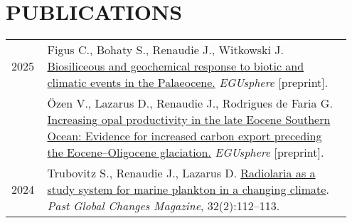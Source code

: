 \documentclass[11pt, a4paper]{article}
\begin{document}
\section{PUBLICATIONS}
\begin{longtable}{@{}p{0.1\linewidth} >{\small}P{0.85\linewidth}@{}}
2025 %
    & Figus C., Bohaty S., Renaudie J., Witkowski J. \href{https://egusphere.copernicus.org/preprints/2025/egusphere-2025-853/}{Biosiliceous and geochemical response to biotic and climatic events in the Palaeocene.} \textit{EGUsphere} [preprint].\\
    & Özen V., Lazarus D., Renaudie J., Rodrigues de Faria G. \href{https://egusphere.copernicus.org/preprints/2025/egusphere-2025-555/}{Increasing opal productivity in the late Eocene Southern Ocean: Evidence for increased carbon export preceding the Eocene--Oligocene glaciation.} \textit{EGUsphere} [preprint].\\
2024 & Trubovitz S., Renaudie J., Lazarus D. \href{https://doi.org/10.22498/pages.32.2.112}{Radiolaria as a study system for marine plankton in a changing climate}. \textit{Past Global Changes Magazine}, 32(2):112--113.\\

\end{longtable}
\end{document}
